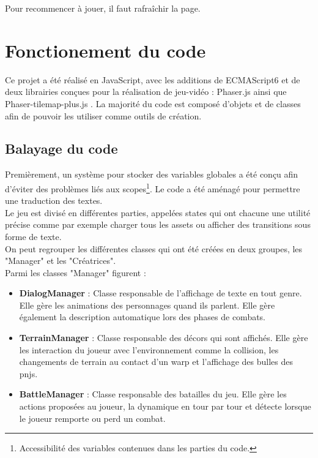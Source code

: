 \documentclass[11pt]{article}
\begin{document}
Pour recommencer à jouer, il faut rafraîchir la page.



\section{Fonctionement du code}
Ce projet a été réalisé en JavaScript, avec les additions de ECMAScript6 et de deux librairies conçues pour la réalisation de jeu-vidéo : Phaser.js ainsi que Phaser-tilemap-plus.js . La majorité du code est composé d'objets et de classes afin de pouvoir les utiliser comme outils de création.\\

\subsection{Balayage du code}
Premièrement, un système pour stocker des variables globales a été conçu afin d'éviter des problèmes liés aux scopes\footnote{\label{scope} Accessibilité des variables contenues dans les parties du code. }. Le code a été aménagé pour permettre une traduction des textes. \\

Le jeu est divisé en différentes parties, appelées states qui ont chacune une utilité précise comme par exemple charger tous les assets ou afficher des transitions sous forme de texte.\\

On peut regrouper les différentes classes qui ont été créées en deux groupes, les "Manager" et les "Créatrices".\\Parmi les classes "Manager" figurent : \\

\begin{itemize}
\item \textbf{DialogManager} : Classe responsable de l'affichage de texte en tout genre. Elle gère les animations des personnages quand ils parlent. Elle gère également la description automatique lors des phases de combats.\\
\item \textbf{TerrainManager} : Classe responsable des décors qui sont affichés. Elle gère les interaction du joueur avec l'environnement comme la collision, les changements de terrain au contact d'un warp et l'affichage des bulles des pnjs.\\
\item \textbf{BattleManager} : Classe responsable des batailles du jeu. Elle gère les actions proposées au joueur, la dynamique en tour par tour et détecte lorsque le joueur remporte ou perd un combat.
\end{itemize}
\end{document}
